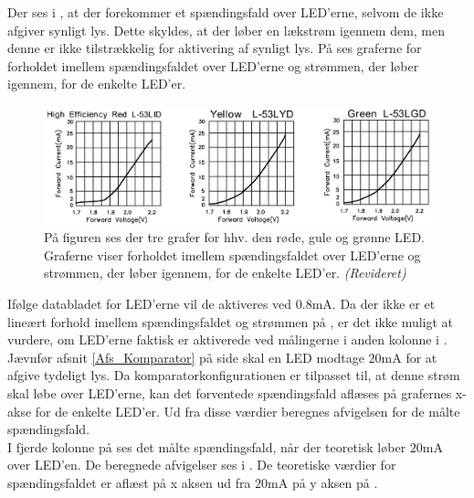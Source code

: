 \noindent Der ses i , at der forekommer et spændingsfald over LED'erne, selvom de ikke afgiver synligt lys. Dette skyldes, at der løber en lækstrøm igennem dem, men denne er ikke tilstrækkelig for aktivering af synligt lys. På  ses graferne for forholdet imellem spændingsfaldet over LED'erne og strømmen, der løber igennem, for de enkelte LED'er. \cite{kingbright}
\begin{figure}[H]
	\centering
	\includegraphics[scale=.45]{figures/cProblemloesning/Samlet_system_LED.PNG}
	\caption{På figuren ses der tre grafer for hhv. den røde, gule og grønne LED. Graferne viser forholdet imellem spændingsfaldet over LED'erne og strømmen, der løber igennem, for de enkelte LED'er. \textit{(Revideret)} \cite{kingbright}}
	\label{fig:samlet_system_LED}
\end{figure}
\noindent Ifølge databladet for LED'erne vil de aktiveres ved $0.8$mA. Da der ikke er et lineært forhold imellem spændingsfaldet og strømmen på , er det ikke muligt at vurdere, om LED'erne faktisk er aktiverede ved målingerne i anden kolonne i . Jævnfør afsnit \ref{Afs_Komparator} på side \pageref{Afs_Komparator} skal en LED modtage $20$mA for at afgive tydeligt lys. Da komparatorkonfigurationen er tilpasset til, at denne strøm skal løbe over LED'erne, kan det forventede spændingsfald aflæses på grafernes x-akse for de enkelte LED'er. Ud fra disse værdier beregnes afvigelsen for de målte spændingsfald. \\
I fjerde kolonne på  ses det målte spændingsfald, når der teoretisk løber $20$mA over LED'en. De beregnede afvigelser ses i . De teoretiske værdier for spændingsfaldet er aflæst på x aksen ud fra $20$mA på y aksen på .
